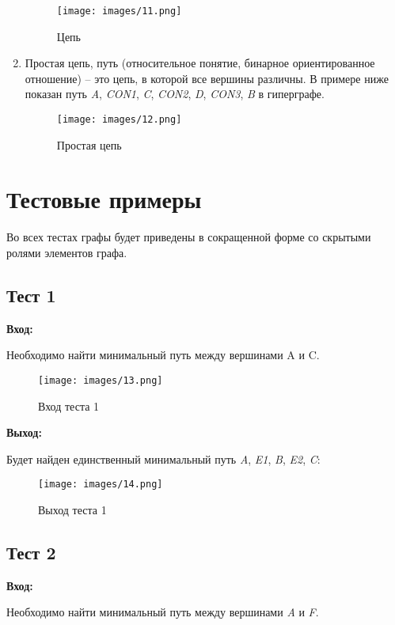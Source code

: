 \begin{enumerate}
\begin{figure}[H]
  \centering
  \texttt{[image: images/11.png]}
  \caption{Цепь}
\end{figure}

\item
  Простая цепь, путь (относительное понятие, бинарное ориентированное
  отношение) -- это цепь, в которой все вершины различны. В примере ниже
  показан путь \emph{A}, \emph{CON1}, \emph{C}, \emph{CON2}, \emph{D},
  \emph{CON3}, \emph{B} в гиперграфе.

\begin{figure}[H]
  \centering
  \texttt{[image: images/12.png]}
  \caption{Простая цепь}
\end{figure}

\end{enumerate}

\section{Тестовые примеры}

Во всех тестах графы будет приведены в сокращенной форме со скрытыми ролями элементов графа.

\subsection{Тест 1}

\textbf{Вход:}

Необходимо найти минимальный путь между вершинами A и C.

\begin{figure}[H]
  \centering
  \texttt{[image: images/13.png]}
  \caption{Вход теста 1}
\end{figure}

\textbf{Выход:}

Будет найден единственный минимальный путь \emph{A}, \emph{E1},
\emph{B}, \emph{E2}, \emph{C}:

\begin{figure}[H]
  \centering
  \texttt{[image: images/14.png]}
  \caption{Выход теста 1}
\end{figure}

\subsection{Тест 2}

\textbf{Вход:}

Необходимо найти минимальный путь между вершинами \emph{A} и \emph{F}.

